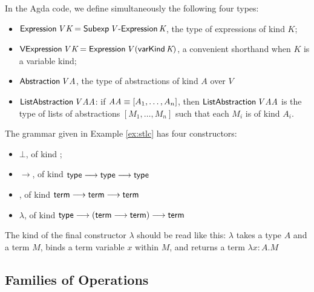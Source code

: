 \documentclass[envcountsame]{llncs}
\begin{document}
In the Agda code, we define simultaneously the following four types:
\begin{itemize}
 \item $\AgdaFunction{Expression} \, \AgdaBound{V} \, \AgdaBound{K} = \AgdaDatatype{Subexp} \, \AgdaBound{V} \, \AgdaInductiveConstructor{-Expression} \, \AgdaBound{K}$,
the type of expressions of kind $K$;
\item $\AgdaFunction{VExpression} \, \AgdaBound{V} \, \AgdaBound{K} = \AgdaFunction{Expression} \,
\AgdaBound{V} \, (\AgdaInductiveConstructor{varKind} \, \AgdaBound{K})$, a convenient
shorthand when $K$ is a variable kind;
\item $\AgdaFunction{Abstraction} \, \AgdaBound{V} \, \AgdaBound{A}$, the type of abstractions
of kind $A$ over $V$
\item $\AgdaFunction{ListAbstraction} \, \AgdaBound{V} \, \AgdaBound{AA}$: if $\AgdaBound{AA} \equiv [ A_1, \ldots, A_n ]$,
then $\AgdaFunction{ListAbstraction} \, \AgdaBound{V} \, \AgdaBound{AA}$ is the type of lists of abstractions $[M_1, \ldots, M_n]$
such that each $M_i$ is of kind $A_i$.
\end{itemize}

  
\begin{example}
The grammar given in Example \ref{ex:stlc} has four constructors:
\begin{itemize}
 \item
$\bot$, of kind ;
\item
$\rightarrow$, of kind $\AgdaFunction{type} \longrightarrow \AgdaFunction{type} \longrightarrow \AgdaFunction{type}$
\item
{}, of kind $\AgdaFunction{term} \longrightarrow \AgdaFunction{term} \longrightarrow \AgdaFunction{term}$
\item
$\lambda$, of kind $\AgdaFunction{type} \longrightarrow (\AgdaFunction{term} \longrightarrow \AgdaFunction{term}) \longrightarrow \AgdaFunction{term}$
\end{itemize}
The kind of the final constructor $\lambda$ should be read like this: $\lambda$ takes a type $A$
and a term $M$, binds a term variable $x$ within $M$, and returns a term $\lambda x:A.M$

\end{example}

\subsection{Families of Operations}
\end{document}
